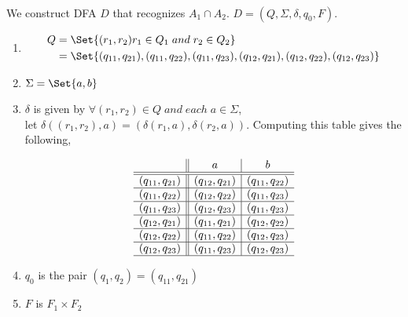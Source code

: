 \documentclass{article}
\providecommand\given{} %
\begin{document}
\paragraph{}

We construct DFA $D$ that recognizes $A_1 \cap A_2$.  $D = (Q, \Sigma, \delta, q_0, F)$.

\begin{enumerate}
    \item 
    \begin{align*}
        Q &= \Set{(r_1, r_2) \given r_1 \in Q_1 \; and \; r_2 \in Q_2} \\ &= \Set{(q_{11}, q_{21}), (q_{11}, q_{22}), (q_{11}, q_{23}), (q_{12}, q_{21}), (q_{12}, q_{22}), (q_{12}, q_{23})}
    \end{align*}
    
    \item $\Sigma = \Set{a,b}$
    \item $\delta$ is given by $\forall (r_1, r_2) \in Q \; and \; each \; a \in \Sigma$, \\ let $\delta((r_1, r_2), a) = (\delta(r_1, a), \delta(r_2, a))$.  Computing this table gives the following,
    
\begin{figure}[H]
\centering

\[
\begin{array}{c||c|c}
         & a & b \\ \hline \hline 
        (q_{11},q_{21}) & (q_{12},q_{21}) & (q_{11},q_{22}) \\ \hline 
        (q_{11},q_{22}) & (q_{12},q_{22}) & (q_{11},q_{23}) \\ \hline 
        (q_{11},q_{23}) & (q_{12},q_{23}) & (q_{11},q_{23}) \\ \hline 
        (q_{12},q_{21}) & (q_{11},q_{21}) & (q_{12},q_{22}) \\ \hline 
        (q_{12},q_{22}) & (q_{11},q_{22}) & (q_{12},q_{23}) \\ \hline 
        (q_{12},q_{23}) & (q_{11},q_{23}) & (q_{12},q_{23}) \\ \hline 
\end{array}
\]

\caption{}
\label{fig:fdsfsdfdsfd}
\end{figure}

    
    \item $q_0$ is the pair $(q_1, q_2) = (q_{11}, q_{21})$
    \item $F$ is $F_1 \times F_2$
\end{enumerate}
\end{document}
